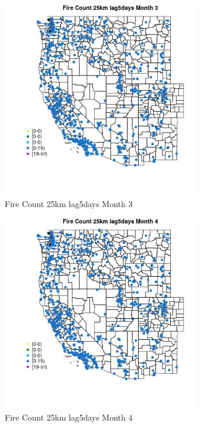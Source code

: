 \begin{figure} 
\centering  
\includegraphics[width=0.77\textwidth]{Code_Outputs/Report_ML_input_PM25_Step4_part_e_de_duplicated_aves_compiled_2019-05-21wNAs_MapObsMo3Fire_Count_25km_lag5days.jpg} 
\caption{\label{fig:Report_ML_input_PM25_Step4_part_e_de_duplicated_aves_compiled_2019-05-21wNAsMapObsMo3Fire_Count_25km_lag5days}Fire Count 25km lag5days Month 3} 
\end{figure} 
 

\begin{figure} 
\centering  
\includegraphics[width=0.77\textwidth]{Code_Outputs/Report_ML_input_PM25_Step4_part_e_de_duplicated_aves_compiled_2019-05-21wNAs_MapObsMo4Fire_Count_25km_lag5days.jpg} 
\caption{\label{fig:Report_ML_input_PM25_Step4_part_e_de_duplicated_aves_compiled_2019-05-21wNAsMapObsMo4Fire_Count_25km_lag5days}Fire Count 25km lag5days Month 4} 
\end{figure} 
 

